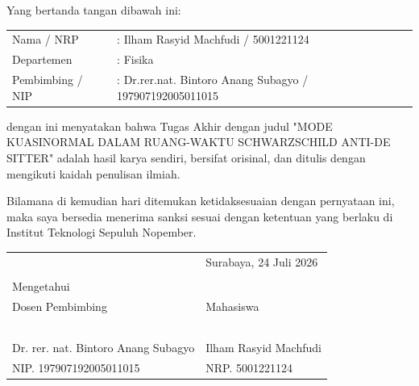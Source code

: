 
\vspace{2ex}

\noindent Yang bertanda tangan dibawah ini:

\vspace{2ex}

\noindent
\begin{minipage}{\textwidth}
    \begin{tabular}{@{}ll}
        Nama / NRP & : Ilham Rasyid Machfudi / 5001221124\\
        Departemen & : Fisika \\
        Pembimbing / NIP & : Dr.rer.nat. Bintoro Anang Subagyo / 197907192005011015\\
    \end{tabular}
\end{minipage}

\vspace{2ex}

\noindent dengan ini menyatakan bahwa Tugas Akhir dengan judul "MODE KUASINORMAL DALAM RUANG-WAKTU SCHWARZSCHILD ANTI-DE SITTER" adalah hasil karya sendiri, bersifat orisinal, dan ditulis dengan mengikuti kaidah penulisan ilmiah.

\vspace{1.5ex}

\noindent Bilamana di kemudian hari ditemukan ketidaksesuaian dengan pernyataan ini, maka saya bersedia menerima sanksi sesuai dengan ketentuan yang berlaku di Institut Teknologi Sepuluh Nopember.

\vspace{8ex}

\noindent\begin{tabularx}{\textwidth}{X l}
    & Surabaya, 24 Juli 2026\\
    & \\
    Mengetahui & \\
    Dosen Pembimbing & Mahasiswa\\
    & \\
    & \\
    & \\
    & \\
    & \\
    Dr. rer. nat. Bintoro Anang Subagyo & Ilham Rasyid Machfudi \\
    NIP. 197907192005011015 & NRP. 5001221124\\
\end{tabularx}

